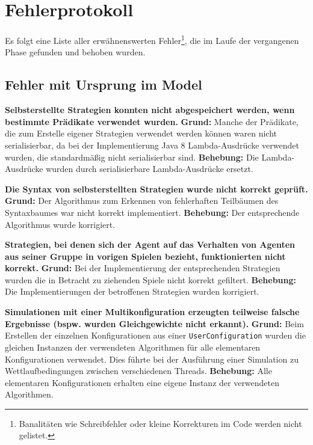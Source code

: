 \documentclass[parskip=full,11pt,openany]{scrreprt}
\begin{document}
\chapter{Fehlerprotokoll}

Es folgt eine Liste aller erwähnenswerten Fehler\footnote{Banalitäten wie Schreibfehler oder kleine Korrekturen im Code werden nicht gelistet.}, die im Laufe der vergangenen Phase gefunden und behoben wurden.

\section{Fehler mit Ursprung im Model}

\textbf{Selbsterstellte Strategien konnten nicht abgespeichert werden, wenn bestimmte Prädikate verwendet wurden.} 
\newline
\textbf{Grund: } Manche der Prädikate, die zum Erstelle eigener Strategien verwendet werden können waren nicht serialisierbar, da bei der Implementierung Java 8 Lambda-Ausdrücke verwendet wurden, die standardmäßig nicht serialisierbar sind.
\newline
\textbf{Behebung: } Die Lambda-Ausdrücke wurden durch serialisierbare Lambda-Ausdrücke ersetzt.

\textbf{Die Syntax von selbsterstellten Strategien wurde nicht korrekt geprüft.} \newline
\textbf{Grund: } Der Algorithmus zum Erkennen von fehlerhaften Teilbäumen des Syntaxbaumes war nicht korrekt implementiert.
\newline
\textbf{Behebung: } Der entsprechende Algorithmus wurde korrigiert.

\textbf{Strategien, bei denen sich der Agent auf das Verhalten von Agenten aus seiner Gruppe in vorigen Spielen bezieht, funktionierten nicht korrekt.} 
\newline
\textbf{Grund: } Bei der Implementierung der entsprechenden Strategien wurden die in Betracht zu ziehenden Spiele nicht korrekt gefiltert.
\newline
\textbf{Behebung: } Die Implementierungen der betroffenen Strategien wurden korrigiert.

\textbf{Simulationen mit einer Multikonfiguration erzeugten teilweise falsche Ergebnisse (bspw. wurden Gleichgewichte nicht erkannt).} 
\newline
\textbf{Grund: } Beim Erstellen der einzelnen Konfigurationen aus einer \texttt{UserConfiguration} wurden die gleichen Instanzen der verwendeten Algorithmen für alle elementaren Konfigurationen verwendet. Dies führte bei der Ausführung einer Simulation zu Wettlaufbedingungen zwischen verschiedenen Threads.
\newline
\textbf{Behebung: } Alle elementaren Konfigurationen erhalten eine eigene Instanz der verwendeten Algorithmen.
\end{document}
